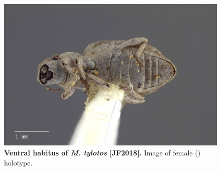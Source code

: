 \documentclass[fleqn,10pt,lineno]{wlpeerj} %
\begin{document}
\begin{figure}[h]
	\begin{sideways}
		\centering
		\includegraphics[height=\textwidth]{tylotos_F_ventral.jpg}
	\end{sideways}
	\caption{\textbf{Ventral habitus of \textit{M. tylotos} [JF2018].} Image of female (\female) holotype.}
	\label{fig:tylotos_F_ventral}
\end{figure}
\end{document}
